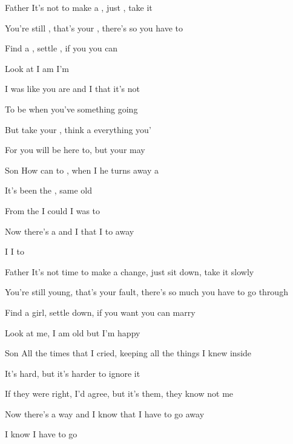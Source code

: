 

Father
\zs
It's not  to make a , just , take it 

You're still , that's your , there's so  you have to 

Find a , settle , if you  you can 

Look at  I am  I'm  
\ks

\zs
I was  like you are  and I  that it's not 

To be  when you've  something going   

But take your , think a   everything you'

For you will  be here to, but your  may   
\ks

Son
\zs
How can  to , when I  he turns away a

It's  been the , same old   

From the  I could  I was  to 

Now there's a  and I  that I  to  away

I  I  to   \\
\ks

Father
\zs
It's not time to make a change, just sit down, take it slowly

You're still young, that's your fault, there's so much you have to go through

Find a girl, settle down, if you want you can marry

Look at me, I am old but I'm happy
\ks

Son
\zs
All the times that I cried, keeping all the things I knew inside

It's hard, but it's harder to ignore it

If they were right, I'd agree, but it's them, they know not me

Now there's a way and I know that I have to go away

I know I have to go
\ks

\kp
